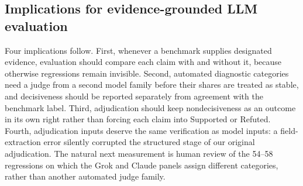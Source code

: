 \subsection{Implications for evidence-grounded LLM evaluation}
Four implications follow.
First, whenever a benchmark supplies designated evidence, evaluation should compare each claim with and without it, because otherwise regressions remain invisible.
Second, automated diagnostic categories need a judge from a second model family before their shares are treated as stable, and decisiveness should be reported separately from agreement with the benchmark label.
Third, adjudication should keep nondecisiveness as an outcome in its own right rather than forcing each claim into Supported or Refuted.
Fourth, adjudication inputs deserve the same verification as model inputs: a field-extraction error silently corrupted the structured stage of our original adjudication.
The natural next measurement is human review of the 54--58 regressions on which the Grok and Claude panels assign different categories, rather than another automated judge family.
